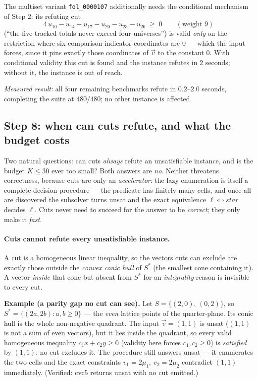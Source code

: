\documentclass[11pt]{article}
\newcommand{\cvc}{\textsf{cvc5}\xspace}
\newcommand{\Sset}{\ensuremath{S}}
\newcommand{\Sstar}{\ensuremath{S^{*}}}
\newcommand{\vv}{\ensuremath{\vec{v}}\xspace}
\begin{document}
The multiset variant \texttt{fol\_0000107} additionally needs the
conditional mechanism of Step 2: its refuting cut
\[
4\,u_{10} - u_{14} - u_{17} - u_{20} - u_{23} - u_{26} \;\ge\; 0
\qquad (\text{weight } 9)
\]
(``the five tracked totals never exceed four universes'') is valid
\emph{only} on the restriction where six comparison-indicator coordinates
are $0$ --- which the input forces, since it pins exactly those
coordinates of $\vv$ to the constant $0$. With conditional validity this
cut is found and the instance refutes in $2$ seconds; without it, the
instance is out of reach.

\emph{Measured result:} all four remaining benchmarks refute in
$0.2$--$2.0$ seconds, completing the suite at 480/480; no other instance
is affected.

\subsection{Step 8: when can cuts refute, and what the budget costs}

Two natural questions: can cuts \emph{always} refute an unsatisfiable
instance, and is the budget $K \le 30$ ever too small? Both answers are
\emph{no}. Neither threatens correctness, because cuts are only an
\emph{accelerator}: the lazy enumeration is itself a complete decision
procedure --- the predicate has finitely many cells, and once all are
discovered the subsolver turns \textsf{unsat} and the exact equivalence
$\ell \Leftrightarrow \mathit{star}$ decides $\ell$. Cuts never need to
succeed for the answer to be \emph{correct}; they only make it \emph{fast}.

\paragraph{Cuts cannot refute every unsatisfiable instance.}
A cut is a homogeneous linear inequality, so the vectors cuts can exclude
are exactly those outside the \emph{convex conic hull} of $\Sstar$ (the
smallest cone containing it). A vector \emph{inside} that cone but absent
from $\Sstar$ for an \emph{integrality} reason is invisible to every cut.

\begin{exbox}
\textbf{Example (a parity gap no cut can see).} Let
$\Sset = \{(2,0),\,(0,2)\}$, so $\Sstar = \{(2a,2b) : a,b\ge 0\}$ --- the
\emph{even} lattice points of the quarter-plane. Its conic hull is the
whole non-negative quadrant. The input $\vv = (1,1)$ is \textsf{unsat}
($(1,1)$ is not a sum of even vectors), but it lies inside the quadrant,
so every valid homogeneous inequality $c_1 x + c_2 y \ge 0$ (validity here
forces $c_1,c_2 \ge 0$) is \emph{satisfied} by $(1,1)$: no cut excludes
it. The procedure still answers \textsf{unsat} --- it enumerates the two
cells and the exact constraints $v_1 = 2\mu_1,\ v_2 = 2\mu_2$ contradict
$(1,1)$ immediately. (Verified: \cvc returns \textsf{unsat} with no cut
emitted.)
\end{exbox}
\end{document}
